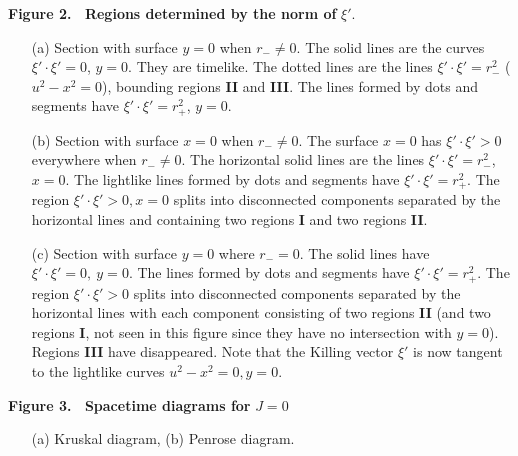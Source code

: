 \documentclass[12pt]{article}
\newcounter{c1} \newcounter{c2}
\begin{document}
\noindent
{\bf Figure 2. \ Regions determined by the norm of} $\xi'$.
\begin{enumerate}
\item[(a)]  Section with surface $y=0$ when $r_- \not= 0$. The solid
lines are the curves $\xi'\cdot \xi' =0$, $y=0$. %
They are timelike. The dotted lines
are the lines $\xi'\cdot\xi' =r_{-}^2$ ($u^2-x^2=0$), %
bounding regions {\bf II} and {\bf III}. The lines formed by dots and segments
 have
$\xi'\cdot \xi'=r_{+}^2$, $y=0$.

\item[(b)] Section with surface $x=0$ when $r_- \not= 0$.
The surface $x=0$ has $\xi'\cdot\xi' > 0$ everywhere when $r_- \not= 0$.  The
 horizontal solid lines are the lines $\xi'\cdot \xi'=r_{-}^2$, $x = 0$. The
 lightlike lines formed by dots and segments have $\xi'\cdot \xi'=r_{+}^2$.
The region
$\xi' \cdot \xi' > 0, x = 0$ splits into disconnected components separated by
 the horizontal lines and containing two regions {\bf I} and two regions {\bf
 II}.

\item[(c)] Section with surface $y=0$ where $r_-=0$. The solid lines
 have $\xi' \cdot \xi' = 0, \ y = 0$. The lines formed by dots and segments
have $\xi' \cdot \xi' = r_+^2$.  The region $\xi'\cdot\xi' > 0$ splits into
 disconnected
components separated by the horizontal lines with each component consisting of
 two regions {\bf II} (and two regions {\bf I}, not seen in this figure since
 they have no intersection with $y=0$). Regions {\bf III} have disappeared.
Note that the Killing vector $\xi'$ is now tangent to the lightlike curves
$u^2-x^2 = 0, y = 0$.
\end{enumerate}
\bigskip
\noindent
{\bf Figure 3. \ Spacetime diagrams for} $J=0$
\begin{enumerate}
\item[(a)] Kruskal diagram,  (b) Penrose diagram.
\end{enumerate}
\end{document}
